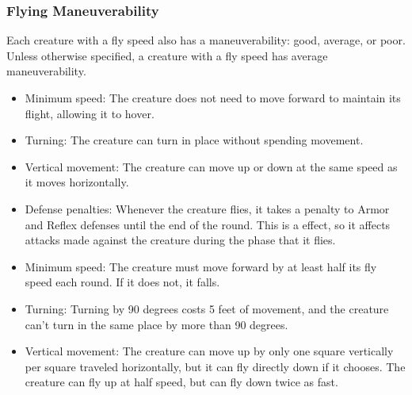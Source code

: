         \subsubsection{Flying Maneuverability}\label{Flying Maneuverability}
        Each creature with a fly speed also has a maneuverability: good, average, or poor.
        Unless otherwise specified, a creature with a fly speed has average maneuverability.

            \begin{itemize}
                \item Minimum speed: The creature does not need to move forward to maintain its flight, allowing it to hover.
                \item Turning: The creature can turn in place without spending movement.
                \item Vertical movement: The creature can move up or down at the same speed as it moves horizontally.
            \end{itemize}

            \begin{itemize}
                \item Defense penalties: Whenever the creature flies, it takes a  penalty to Armor and Reflex defenses until the end of the round.
                    This is a  effect, so it affects attacks made against the creature during the phase that it flies.
                \item Minimum speed: The creature must move forward by at least half its fly speed each round. If it does not, it falls.
                \item Turning: Turning by 90 degrees costs 5 feet of movement, and the creature can't turn in the same place by more than 90 degrees.
                \item Vertical movement: The creature can move up by only one square vertically per square traveled horizontally, but it can fly directly down if it chooses.
                    The creature can fly up at half speed, but can fly down twice as fast.
            \end{itemize}

